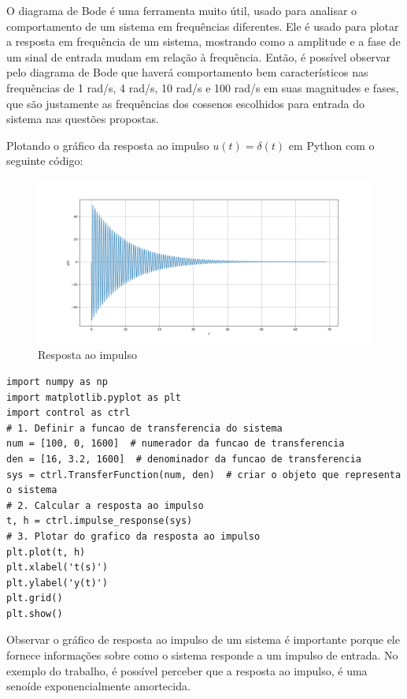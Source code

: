 \documentclass[10pt]{article}
\begin{document}
\quad O diagrama de Bode é uma ferramenta muito útil,
usado para analisar o comportamento de um sistema em frequências diferentes.
Ele é usado para plotar a resposta em frequência de um sistema,
mostrando como a amplitude e a fase de um sinal de entrada mudam em relação à frequência.
Então, é possível observar pelo diagrama de Bode que haverá comportamento bem característicos nas frequências de 1 rad/s,
4 rad/s, 10 rad/s e 100 rad/s em suas magnitudes e fases,
que são justamente as frequências dos cossenos escolhidos para entrada do sistema nas questões propostas.

\quad Plotando o gráfico da resposta ao impulso $u(t) = \delta(t)$ em Python com o seguinte código:

\begin{figure}[h]
    \centering
    \includegraphics[scale=0.4]{impulso.png}
    \caption{Resposta ao impulso}
\end{figure}

\begin{lstlisting}
import numpy as np
import matplotlib.pyplot as plt
import control as ctrl
# 1. Definir a funcao de transferencia do sistema
num = [100, 0, 1600]  # numerador da funcao de transferencia
den = [16, 3.2, 1600]  # denominador da funcao de transferencia
sys = ctrl.TransferFunction(num, den)  # criar o objeto que representa o sistema
# 2. Calcular a resposta ao impulso
t, h = ctrl.impulse_response(sys)
# 3. Plotar do grafico da resposta ao impulso
plt.plot(t, h)
plt.xlabel('t(s)')
plt.ylabel('y(t)')
plt.grid()
plt.show()
\end{lstlisting}

\quad Observar o gráfico de resposta ao impulso de um sistema é importante porque ele fornece informações sobre como o sistema responde a um impulso de entrada.
No exemplo do trabalho, é possível perceber que a resposta ao impulso, é uma senoíde exponencialmente amortecida.
\end{document}
